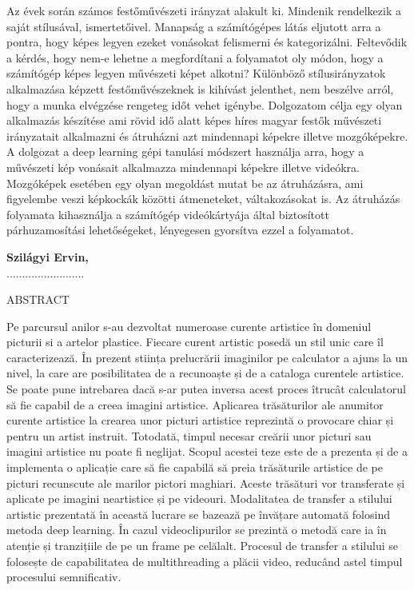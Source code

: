 \documentclass[12pt, a4paper, oneside]{book}
\theoremstyle{tetel}
\begin{document}
Az évek során számos festőművészeti irányzat alakult ki. Mindenik rendelkezik a saját stílusával, ismertetőivel. Manapság a számítógépes látás eljutott arra a pontra, hogy képes legyen ezeket vonásokat felismerni és kategorizálni. Feltevődik a kérdés, hogy nem-e lehetne a megfordítani a folyamatot oly módon, hogy a számítógép képes legyen művészeti képet alkotni?
\newline
\indent
Különböző stílusirányzatok alkalmazása képzett festőművészeknek is kihívást jelenthet, nem beszélve arról, hogy a munka elvégzése rengeteg időt vehet igénybe. Dolgozatom célja egy olyan alkalmazás készítése ami rövid idő alatt képes híres magyar festők művészeti irányzatait alkalmazni és átruházni azt mindennapi képekre illetve mozgóképekre.
\newline
\indent
A dolgozat a deep learning gépi tanulási módszert használja arra, hogy a művészeti kép vonásait alkalmazza mindennapi képekre illetve videókra. Mozgóképek esetében egy olyan megoldást mutat be az átruházásra, ami figyelembe veszi képkockák közötti átmeneteket, váltakozásokat is. Az átruházás folyamata kihasználja a számítógép videókártyája által biztosított párhuzamosítási lehetőségeket, lényegesen gyorsítva ezzel a folyamatot. 

\begin{flushright}
\textbf{Szilágyi Ervin,}\\
.........................
\end{flushright}

\newpage
\thispagestyle{empty}
\begin{center}
    \Large ABSTRACT
\end{center}

Pe parcursul anilor s-au dezvoltat numeroase curente artistice în domeniul picturii si a artelor plastice. Fiecare curent artistic posedă un stil unic care îl caracterizează. În prezent stiința prelucrării imaginilor pe calculator a ajuns la un nivel, la care are posibilitatea de a recunoaște și de a cataloga curentele artistice. Se poate pune intrebarea dacă s-ar putea inversa acest proces îtrucât calculatorul să fie capabil de a creea imagini artistice.
\newline
\indent
Aplicarea trăsăturilor ale anumitor curente artistice la crearea unor picturi artistice reprezintă o provocare chiar și pentru un artist instruit. Totodată, timpul necesar creării unor picturi sau imagini artistice nu poate fi neglijat. Scopul acestei teze este de a prezenta și de a implementa o aplicație care să fie capabilă să preia trăsăturile artistice de pe picturi recunscute ale marilor pictori maghiari. Aceste trăsături vor transferate și aplicate pe imagini neartistice și pe videouri.
\newline
\indent
Modalitatea de transfer a stilului artistic prezentată în această lucrare se bazează pe învățare automată folosind metoda deep learning. În cazul videoclipurilor se prezintă o metodă care ia în atenție și tranzițiile de pe un frame pe celălalt. Procesul de transfer a stilului se folosește de capabilitatea de multithreading a plăcii video, reducând astel timpul procesului semnificativ. 
\end{document}

